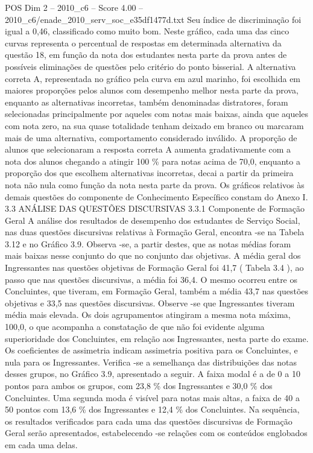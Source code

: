 \begin{textsample}{POS Dim 2 – 2010\_c6 – Score 4.00 – 2010\_c6/enade\_2010\_serv\_soc\_e35df1477d.txt}
Seu índice de discriminação foi igual a 0,46, classificado como muito bom.
Neste gráfico, cada uma das cinco curvas representa o percentual de respostas em determinada alternativa da questão 18, em função da nota dos estudantes nesta parte da prova antes de possíveis eliminações de questões pelo critério do ponto bisserial.
A alternativa correta A, representada no gráfico pela curva em azul marinho, foi escolhida em maiores proporções pelos alunos com desempenho melhor nesta parte da prova, enquanto as alternativas incorretas, também denominadas distratores, foram selecionadas principalmente por aqueles com notas mais baixas, ainda que aqueles com nota zero, na sua quase totalidade tenham deixado em branco ou marcaram mais de uma alternativa, comportamento considerado inválido.
A proporção de alunos que selecionaram a resposta correta A aumenta gradativamente com a nota dos alunos chegando a atingir 100 \% para notas acima de 70,0, enquanto a proporção dos que escolhem alternativas incorretas, decai a partir da primeira nota não nula como função da nota nesta parte da prova.
Os gráficos relativos às demais questões do componente de Conhecimento Específico constam do Anexo I. 3.3 ANÁLISE DAS QUESTÕES DISCURSIVAS 3.3.1 Componente de Formação Geral A análise dos resultados de desempenho dos estudantes de Serviço Social, nas duas questões discursivas relativas à Formação Geral, encontra -se na Tabela 3.12 e no Gráfico 3.9.
Observa -se, a partir destes, que as notas médias foram mais baixas nesse conjunto do que no conjunto das objetivas.
A média geral dos Ingressantes nas questões objetivas de Formação Geral foi 41,7 ( Tabela 3.4 ), ao passo que nas questões discursivas, a média foi 36,4.
O mesmo ocorreu entre os Concluintes, que tiveram, em Formação Geral, também a média 43,7 nas questões objetivas e 33,5 nas questões discursivas.
Observe -se que Ingressantes tiveram média mais elevada.
Os dois agrupamentos atingiram a mesma nota máxima, 100,0, o que acompanha a constatação de que não foi evidente alguma superioridade dos Concluintes, em relação aos Ingressantes, nesta parte do exame.
Os coeficientes de assimetria indicam assimetria positiva para os Concluintes, e nula para os Ingressantes.
Verifica -se a semelhança das distribuições das notas desses grupos, no Gráfico 3.9, apresentado a seguir.
A faixa modal é a de 0 a 10 pontos para ambos os grupos, com 23,8 \% dos Ingressantes e 30,0 \% dos Concluintes.
Uma segunda moda é visível para notas mais altas, a faixa de 40 a 50 pontos com 13,6 \% dos Ingressantes e 12,4 \% dos Concluintes.
Na sequência, os resultados verificados para cada uma das questões discursivas de Formação Geral serão apresentados, estabelecendo -se relações com os conteúdos englobados em cada uma delas.

\end{textsample}
